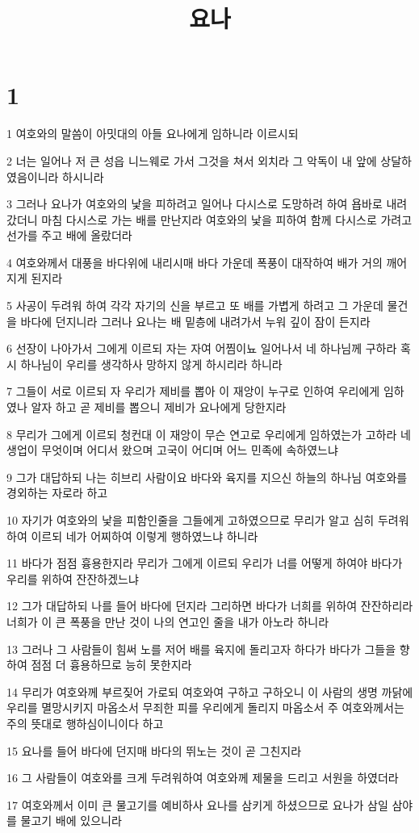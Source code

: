 

\title{요나}


\chapter{1}

\par 1 여호와의 말씀이 아밋대의 아들 요나에게 임하니라 이르시되
\par 2 너는 일어나 저 큰 성읍 니느웨로 가서 그것을 쳐서 외치라 그 악독이 내 앞에 상달하였음이니라 하시니라
\par 3 그러나 요나가 여호와의 낯을 피하려고 일어나 다시스로 도망하려 하여 욥바로 내려갔더니 마침 다시스로 가는 배를 만난지라 여호와의 낯을 피하여 함께 다시스로 가려고 선가를 주고 배에 올랐더라
\par 4 여호와께서 대풍을 바다위에 내리시매 바다 가운데 폭풍이 대작하여 배가 거의 깨어지게 된지라
\par 5 사공이 두려워 하여 각각 자기의 신을 부르고 또 배를 가볍게 하려고 그 가운데 물건을 바다에 던지니라 그러나 요나는 배 밑층에 내려가서 누워 깊이 잠이 든지라
\par 6 선장이 나아가서 그에게 이르되 자는 자여 어찜이뇨 일어나서 네 하나님께 구하라 혹시 하나님이 우리를 생각하사 망하지 않게 하시리라 하니라
\par 7 그들이 서로 이르되 자 우리가 제비를 뽑아 이 재앙이 누구로 인하여 우리에게 임하였나 알자 하고 곧 제비를 뽑으니 제비가 요나에게 당한지라
\par 8 무리가 그에게 이르되 청컨대 이 재앙이 무슨 연고로 우리에게 임하였는가 고하라 네 생업이 무엇이며 어디서 왔으며 고국이 어디며 어느 민족에 속하였느냐
\par 9 그가 대답하되 나는 히브리 사람이요 바다와 육지를 지으신 하늘의 하나님 여호와를 경외하는 자로라 하고
\par 10 자기가 여호와의 낯을 피함인줄을 그들에게 고하였으므로 무리가 알고 심히 두려워하여 이르되 네가 어찌하여 이렇게 행하였느냐 하니라
\par 11 바다가 점점 흉용한지라 무리가 그에게 이르되 우리가 너를 어떻게 하여야 바다가 우리를 위하여 잔잔하겠느냐
\par 12 그가 대답하되 나를 들어 바다에 던지라 그리하면 바다가 너희를 위하여 잔잔하리라 너희가 이 큰 폭풍을 만난 것이 나의 연고인 줄을 내가 아노라 하니라
\par 13 그러나 그 사람들이 힘써 노를 저어 배를 육지에 돌리고자 하다가 바다가 그들을 향하여 점점 더 흉용하므로 능히 못한지라
\par 14 무리가 여호와께 부르짖어 가로되 여호와여 구하고 구하오니 이 사람의 생명 까닭에 우리를 멸망시키지 마옵소서 무죄한 피를 우리에게 돌리지 마옵소서 주 여호와께서는 주의 뜻대로 행하심이니이다 하고
\par 15 요나를 들어 바다에 던지매 바다의 뛰노는 것이 곧 그친지라
\par 16 그 사람들이 여호와를 크게 두려워하여 여호와께 제물을 드리고 서원을 하였더라
\par 17 여호와께서 이미 큰 물고기를 예비하사 요나를 삼키게 하셨으므로 요나가 삼일 삼야를 물고기 배에 있으니라

